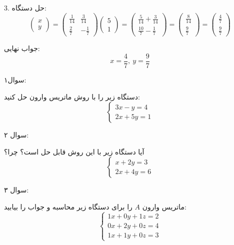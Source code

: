 \begin{example}[]
	3. حل دستگاه:
	\[
	\begin{pmatrix}
		x \\
		y
	\end{pmatrix}
	=
	\begin{pmatrix}
		\frac{1}{14} & \frac{3}{14} \\
		\frac{2}{7} & -\frac{1}{7}
	\end{pmatrix}
	\begin{pmatrix}
		5 \\
		1
	\end{pmatrix}
	=
	\begin{pmatrix}
		\frac{5}{14} + \frac{3}{14} \\
		\frac{10}{7} - \frac{1}{7}
	\end{pmatrix}
	=
	\begin{pmatrix}
		\frac{8}{14} \\
		\frac{9}{7}
	\end{pmatrix}
	=
	\begin{pmatrix}
		\frac{4}{7} \\
		\frac{9}{7}
	\end{pmatrix}
	\]
	
	جواب نهایی:
	\[
	x = \frac{4}{7}, \ y = \frac{9}{7}
	\]
\end{example}


 \begin{exercise}
 	سوال۱:
 	
 دستگاه زیر را با روش ماتریس وارون حل کنید:
 \[
 \begin{cases}
 	3x - y = 4 \\
 	2x + 5y = 1
 \end{cases}
 \]
 
 سوال ۲:
 
 آیا دستگاه زیر با این روش قابل حل است؟ چرا؟
 \[
 \begin{cases}
 	x + 2y = 3 \\
 	2x + 4y = 6
 \end{cases}
 \]
 
 سوال ۳:
 
 ماتریس وارون \( A \) را برای دستگاه زیر محاسبه و جواب را بیابید:
 \[
 \begin{cases}
 	1x + 0y + 1z = 2 \\
 	0x + 2y + 0z = 4 \\
 	1x + 1y + 0z = 3
 \end{cases}
 \]	
 \end{exercise}
 \begin{code}
 	\begin{latin}
 		  
 	\end{latin}
 \end{code}
